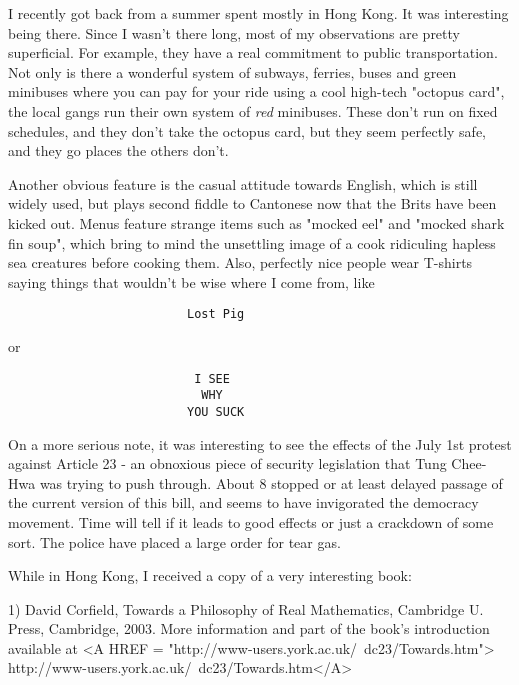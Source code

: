 


I recently got back from a summer spent mostly in Hong Kong.
It was interesting being there.  Since I wasn't there long,
most of my observations are pretty superficial.  For example, 
they have a real commitment to public transportation.  Not 
only is there a wonderful system of subways, ferries, buses 
and green minibuses where you can pay for your ride using a 
cool high-tech "octopus card", the local gangs run their own 
system of \emph{red} minibuses.  These don't run on fixed schedules, 
and they don't take the octopus card, but they seem perfectly
safe, and they go places the others don't.  

Another obvious feature is the casual attitude towards English, 
which is still widely used, but plays second fiddle to Cantonese 
now that the Brits have been kicked out.  Menus feature strange 
items such as "mocked eel" and "mocked shark fin soup", which 
bring to mind the unsettling image of a cook ridiculing hapless
sea creatures before cooking them.  Also, perfectly nice people 
wear T-shirts saying things that wouldn't be wise where I come 
from, like

\begin{verbatim}
                         Lost Pig
\end{verbatim}
    
or 

\begin{verbatim}
                          I SEE 
                           WHY 
                         YOU SUCK
\end{verbatim}
    
On a more serious note, it was interesting to see the effects 
of the July 1st protest against Article 23 - an obnoxious piece of
security legislation that Tung Chee-Hwa was trying to push through.   
About 8%
stopped or at least delayed passage of the current version of this 
bill, and seems to have invigorated the democracy movement.  Time 
will tell if it leads to good effects or just a crackdown of some 
sort.  The police have placed a large order for tear gas.   

While in Hong Kong, I received a copy of a very interesting book:

1) David Corfield, Towards a Philosophy of Real Mathematics,
Cambridge U. Press, Cambridge, 2003.  More information
and part of the book's introduction available at 
<A HREF = "http://www-users.york.ac.uk/~dc23/Towards.htm">
http://www-users.york.ac.uk/~dc23/Towards.htm</A>

